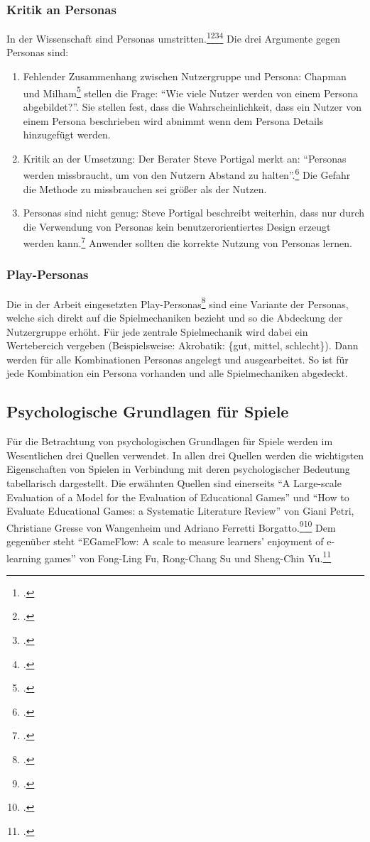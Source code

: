 	\subsubsection{Kritik an Personas}
		In der Wissenschaft sind Personas umstritten.\footcite{persona-crit}\footcite{persona-crit2}\footcite{persona-crit3}\footcite{persona-crit4} Die drei Argumente gegen Personas sind:
		\begin{enumerate}\obeylines
			\item{ Fehlender Zusammenhang zwischen Nutzergruppe und Persona: Chapman und Milham\footcite{persona-crit} stellen die Frage: \enquote{Wie viele Nutzer werden von einem Persona abgebildet?}. Sie stellen fest, dass die Wahrscheinlichkeit, dass ein Nutzer von einem Persona beschrieben wird abnimmt wenn dem Persona Details hinzugefügt werden. }
			\item{ Kritik an der Umsetzung: Der Berater Steve Portigal merkt an: \enquote{Personas werden missbraucht, um von den Nutzern Abstand zu halten}.\footcite[Übersetzt aus dem Orginal: \enquote{Personas are misused to maintain a “safe” distance from the people we design for [\dots]}]{persona-crit4}
			Die Gefahr die Methode zu missbrauchen sei größer als der Nutzen. }
			\item{ Personas sind nicht genug: Steve Portigal beschreibt weiterhin, dass nur durch die Verwendung von Personas kein benutzerorientiertes Design erzeugt werden kann.\footcite[Seite 4, links]{persona-crit4} Anwender sollten die korrekte Nutzung von Personas lernen. }
		\end{enumerate}
	\subsubsection{Play-Personas}
		Die in der Arbeit eingesetzten Play-Personas\footcite{play-persona} sind eine Variante der Personas, welche sich direkt auf die Spielmechaniken bezieht und so die Abdeckung der Nutzergruppe erhöht. Für jede zentrale Spielmechanik wird dabei ein Wertebereich vergeben (Beispielsweise: Akrobatik: \{gut, mittel, schlecht\}). Dann werden für alle Kombinationen Personas angelegt und ausgearbeitet. So ist für jede Kombination ein Persona vorhanden und alle Spielmechaniken abgedeckt.

\subsection{Psychologische Grundlagen für Spiele}\label{ssec:psycho-grundlagen}
	Für die Betrachtung von psychologischen Grundlagen für Spiele werden im Wesentlichen drei Quellen verwendet. In allen drei Quellen werden die wichtigsten Eigenschaften von Spielen in Verbindung mit deren psychologischer Bedeutung tabellarisch dargestellt.
	Die erwähnten Quellen sind einerseits  \enquote{A Large-scale Evaluation of a Model for the Evaluation of Educational Games} und \enquote{How to Evaluate Educational Games: a Systematic Literature Review} von Giani Petri, Christiane Gresse von Wangenheim und Adriano Ferretti Borgatto.\footcite{psych1}\footcite{psych3} Dem gegenüber steht \enquote{EGameFlow: A scale to measure learners' enjoyment of e-learning games} von Fong-Ling Fu, Rong-Chang Su und Sheng-Chin Yu.\footcite{psych2}

